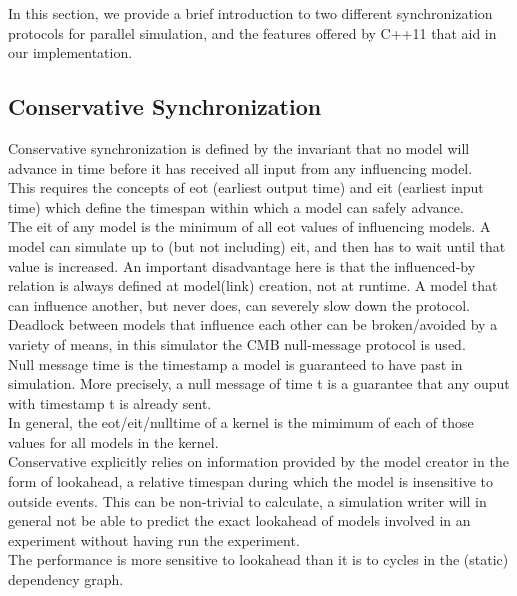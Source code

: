 In this section, we provide a brief introduction to two different synchronization protocols for parallel simulation, and the features offered by C++11 that aid in our implementation.

\subsection{Conservative Synchronization}
Conservative synchronization is defined by the invariant that no model will advance in time before it has received all input from any influencing model. \\
This requires the concepts of eot (earliest output time) and eit (earliest input time) which define the timespan within which a model can safely advance. \\ The eit of any model is the minimum of all eot values of influencing models. A model can simulate up to (but not including) eit, and then has to wait until that value is increased. An important disadvantage here is that the influenced-by relation is always defined at model(link) creation, not at runtime. A model that can influence another, but never does, can severely slow down the protocol.\\ 
Deadlock between models that influence each other can be broken/avoided by a variety of
means, in this simulator the CMB \cite{Chandy:1981:ADS:358598.358613} null-message protocol is used. \\
Null message time is the timestamp a model is guaranteed to have past in simulation. More precisely, a null message of time t is a guarantee that any ouput with timestamp t is already sent.\\
In general, the eot/eit/nulltime of a kernel is the mimimum of each of those values for all models in the kernel.\\
Conservative explicitly relies on information provided by the model creator in the form of lookahead, a relative timespan during which the model is insensitive to outside events. This can be non-trivial to calculate, a simulation writer will in general not be able to predict the exact lookahead of models involved in an experiment without having run the experiment.\\
The performance is more sensitive to lookahead than it is to cycles in the (static) dependency graph.
